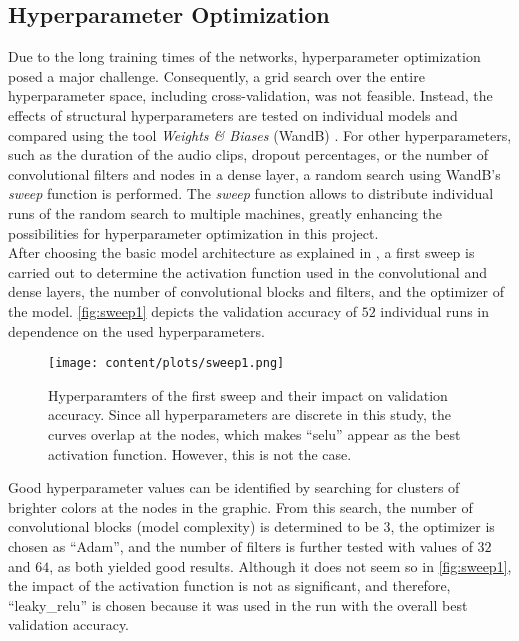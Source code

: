 \subsection{Hyperparameter Optimization}
\label{subsec:hyperparameter}
Due to the long training times of the networks, hyperparameter optimization posed a major challenge. Consequently, a grid search over the entire hyperparameter space, 
including cross-validation, was not feasible. Instead, the effects of structural hyperparameters are tested on individual models and compared using the tool \textit{Weights \& Biases} 
(WandB) \cite{wandb}. For other hyperparameters, such as the duration of the audio clips, dropout percentages, or the number of convolutional filters and nodes in a dense layer, 
a random search using WandB's \textit{sweep} function is performed. The \textit{sweep} function allows to distribute individual runs of the random search to multiple machines, 
greatly enhancing the possibilities for hyperparameter optimization in this project. \\
After choosing the basic model architecture as explained in , a first sweep is carried out to determine the activation function 
used in the convolutional and dense layers, the number of convolutional blocks and filters, and the optimizer of the model. \autoref{fig:sweep1} depicts the validation 
accuracy of $\num{52}$ individual runs in dependence on the used hyperparameters.
\begin{figure}
    \centering 
    \texttt{[image: content/plots/sweep1.png]}
    \caption{Hyperparamters of the first sweep and their impact on validation accuracy. Since all hyperparameters are discrete in this study, the curves overlap at the nodes,
            which makes \enquote{selu} appear as the best activation function. However, this is not the case.}
    \label{fig:sweep1}
\end{figure}
Good hyperparameter values can be identified by searching for clusters of brighter colors at the nodes in the graphic. From this search, the number of convolutional blocks 
(model complexity) is determined to be $\num{3}$, the optimizer is chosen as \enquote{Adam}, and the number of filters is further tested with values of $\num{32}$ and $\num{64}$, 
as both yielded good results. Although it does not seem so in \autoref{fig:sweep1}, the impact of the activation function is not as significant, and therefore, \enquote{leaky\_relu} 
is chosen because it was used in the run with the overall best validation accuracy. \\
